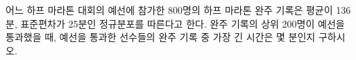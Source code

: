 어느 하프 마라톤 대회의 예선에 참가한 800명의 하프 마라톤 완주 기록은 평균이 136분, 표준편차가 25분인 정규분포를 따른다고 한다. 완주 기록의 상위 200명이 예선을 통과했을 때, 예선을 통과한 선수들의 완주 기록 중 가장 긴 시간은 몇 분인지 구하시오. 
